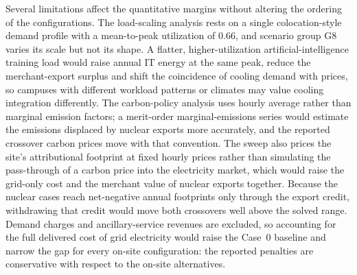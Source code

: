\documentclass[a4paper,fleqn]{cas-sc}
\begin{document}
Several limitations affect the quantitative margins without altering the ordering of the configurations. The load-scaling analysis rests on a single colocation-style demand profile with a mean-to-peak utilization of 0.66, and scenario group G8 varies its scale but not its shape. A flatter, higher-utilization artificial-intelligence training load would raise annual IT energy at the same peak, reduce the merchant-export surplus and shift the coincidence of cooling demand with prices, so campuses with different workload patterns or climates may value cooling integration differently. The carbon-policy analysis uses hourly average rather than marginal emission factors; a merit-order marginal-emissions series would estimate the emissions displaced by nuclear exports more accurately, and the reported crossover carbon prices move with that convention. The sweep also prices the site's attributional footprint at fixed hourly prices rather than simulating the pass-through of a carbon price into the electricity market, which would raise the grid-only cost and the merchant value of nuclear exports together. Because the nuclear cases reach net-negative annual footprints only through the export credit, withdrawing that credit would move both crossovers well above the solved range. Demand charges and ancillary-service revenues are excluded, so accounting for the full delivered cost of grid electricity would raise the Case~0 baseline and narrow the gap for every on-site configuration: the reported penalties are conservative with respect to the on-site alternatives.
\end{document}
